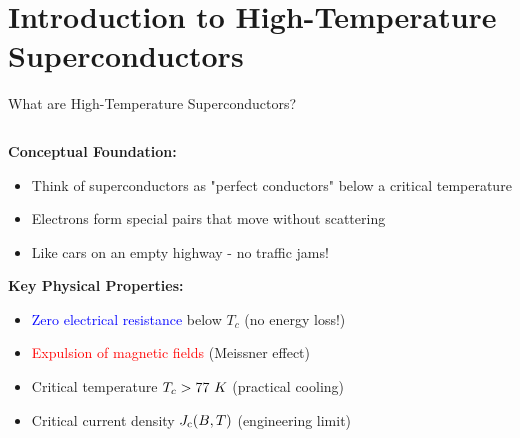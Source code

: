 \section{Introduction to High-Temperature Superconductors}

\begin{frame}{What are High-Temperature Superconductors?}
    \begin{columns}
        \begin{column}{0.6\textwidth}
            \textbf{Conceptual Foundation:}
            \begin{itemize}
                \item Think of superconductors as "perfect conductors" below a critical temperature
                \item Electrons form special pairs that move without scattering
                \item Like cars on an empty highway - no traffic jams!
            \end{itemize}
            
            \vspace{0.3cm}
            \textbf{Key Physical Properties:}
            \begin{itemize}
                \item \textcolor{blue}{Zero electrical resistance} below $T_c$ (no energy loss!)
                \item \textcolor{red}{Expulsion of magnetic fields} (Meissner effect)
                \item Critical temperature $T_c > 77~K$ (practical cooling)
                \item Critical current density $J_\text{c}(B,T)$ (engineering limit)
            \end{itemize}
            

\end{column}
\end{columns}
\end{frame}
